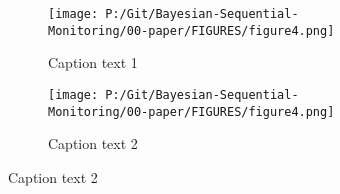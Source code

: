 \documentclass[12pt]{article}
\begin{document}
\begin{figure}
  \begin{subfigure}{6cm}
    \centering\texttt{[image: P:/Git/Bayesian-Sequential-Monitoring/00-paper/FIGURES/figure4.png]}
    \caption{Caption text 1}
  \end{subfigure}
  \begin{subfigure}{6cm}
    \centering\texttt{[image: P:/Git/Bayesian-Sequential-Monitoring/00-paper/FIGURES/figure4.png]}
    \caption{Caption text 2}
  \end{subfigure}
 
\end{figure}
\end{document}
